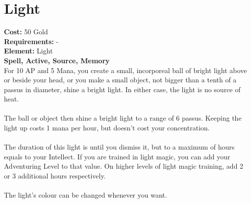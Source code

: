 \section{Light}
\textbf{Cost:} 50 Gold\\
\textbf{Requirements:} -\\
\textbf{Element:} Light\\
\textbf{Spell, Active, Source, Memory}\\
For 10 AP and 5 Mana, you create a small, incorporeal ball of bright light above or beside your head, or you make a small object, not bigger than a tenth of a passus in diameter, shine a bright light. In either case, the light is no source of heat.\\
\\
The ball or object then shine a bright light to a range of 6 passus. Keeping the light up costs 1 mana per hour, but doesn't cost your concentration.\\
\\
The duration of this light is until you dismiss it, but to a maximum of hours equals to your Intellect. If you are trained in light magic, you can add your Adventuring Level to that value. On higher levels of light magic training, add 2 or 3 additional hours respectively.\\
\\
The light's colour can be changed whenever you want.\\